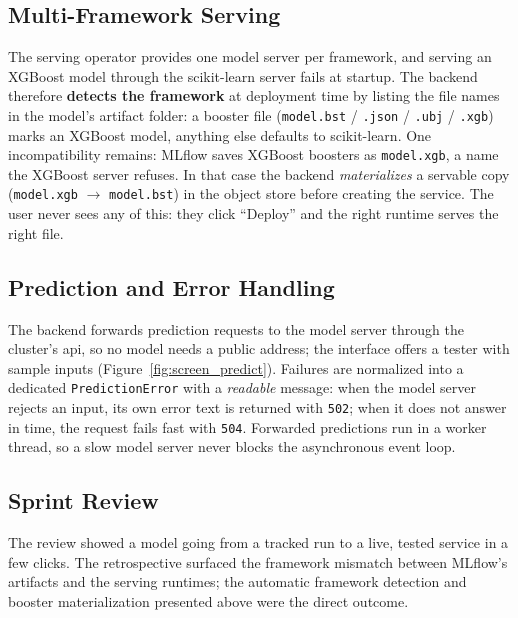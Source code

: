 
\subsection{Multi-Framework Serving}
\label{sec:multi-framework}
The serving operator provides one model server per framework, and serving an
XGBoost model through the scikit-learn server fails at startup. The backend
therefore \textbf{detects the framework} at deployment time by listing the
file names in the model's artifact folder: a booster file
(\texttt{model.bst} / \texttt{.json} / \texttt{.ubj} / \texttt{.xgb}) marks an
XGBoost model, anything else defaults to scikit-learn. One incompatibility
remains: MLflow saves XGBoost boosters as \texttt{model.xgb}, a name the
XGBoost server refuses. In that case the backend \emph{materializes} a servable
copy (\texttt{model.xgb} $\rightarrow$ \texttt{model.bst}) in the object store
before creating the service. The user never sees any of this: they click
``Deploy'' and the right runtime serves the right file.

\subsection{Prediction and Error Handling}
\label{sec:prediction-errors}
The backend forwards prediction requests to the model server through the
cluster's \gls{api}, so no model needs a public address; the interface offers
a tester with sample inputs (Figure~\ref{fig:screen_predict}). Failures are
normalized into a dedicated \texttt{PredictionError} with a \emph{readable}
message: when the model server rejects an input, its own error text is returned
with \texttt{502}; when it does not answer in time, the request fails fast with
\texttt{504}. Forwarded predictions run in a worker thread, so a slow model
server never blocks the asynchronous event loop.


\subsection{Sprint Review}
The review showed a model going from a tracked run to a live, tested service
in a few clicks. The retrospective surfaced the framework mismatch between
MLflow's artifacts and the serving runtimes; the automatic framework detection
and booster materialization presented above were the direct outcome.

